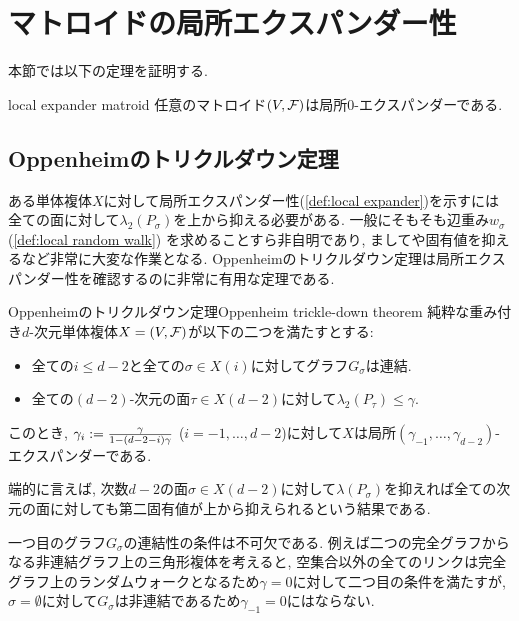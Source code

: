 \section{マトロイドの局所エクスパンダー性}
本節では以下の定理を証明する.
\begin{lemma}{}{local expander matroid}
    任意のマトロイド$(V,\mathcal{F})$は局所$0$-エクスパンダーである.
\end{lemma}


\subsection{Oppenheimのトリクルダウン定理}
ある単体複体$X$に対して局所エクスパンダー性(\cref{def:local expander})を示すには全ての面に対して$\lambda_2(P_\sigma)$を上から抑える必要がある.
一般にそもそも辺重み$w_\sigma$ (\cref{def:local random walk}) を求めることすら非自明であり, ましてや固有値を抑えるなど非常に大変な作業となる.
Oppenheimのトリクルダウン定理は局所エクスパンダー性を確認するのに非常に有用な定理である.
\begin{theorem}{Oppenheimのトリクルダウン定理}{Oppenheim trickle-down theorem}
    純粋な重み付き$d$-次元単体複体$X = (V,\mathcal{F})$が以下の二つを満たすとする:
    \begin{itemize}
    \item 全ての$i\le d-2$と全ての$\sigma\in X(i)$に対してグラフ$G_\sigma$は連結.
    \item 全ての$(d-2)$-次元の面$\tau \in X(d-2)$に対して$\lambda_2(P_\tau) \le \gamma$.
    \end{itemize}
    このとき, $\gamma_i \mathrel{:=} \frac{\gamma}{1-(d-2-i)\gamma}$ ($i=-1,\dots,d-2$)に対して$X$は局所$(\gamma_{-1},\dots,\gamma_{d-2})$-エクスパンダーである.
\end{theorem}
端的に言えば, 次数$d-2$の面$\sigma \in X(d-2)$に対して$\lambda(P_\sigma)$を抑えれば全ての次元の面に対しても第二固有値が上から抑えられるという結果である.

一つ目のグラフ$G_\sigma$の連結性の条件は不可欠である.
例えば二つの完全グラフからなる非連結グラフ上の三角形複体を考えると,
空集合以外の全てのリンクは完全グラフ上のランダムウォークとなるため$\gamma=0$に対して二つ目の条件を満たすが, $\sigma=\emptyset$に対して$G_\sigma$は非連結であるため$\gamma_{-1}=0$にはならない.



